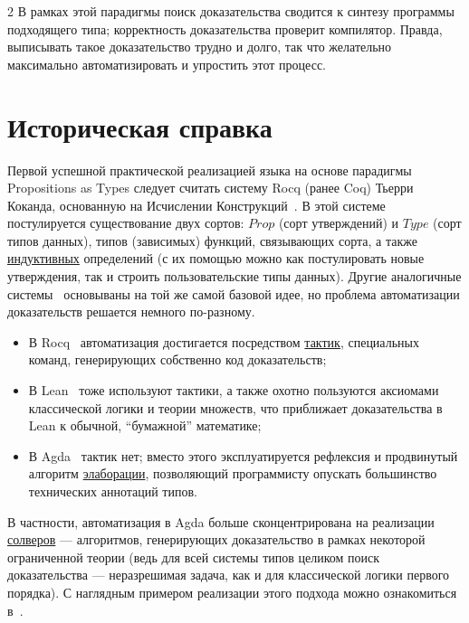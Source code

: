 \documentclass[final]{beamer}
\begin{document}
\begin{frame}[t]
\begin{multicols}{2}
В рамках этой парадигмы поиск доказательства сводится к
синтезу программы подходящего типа; корректность
доказательства проверит компилятор. Правда, выписывать
такое доказательство трудно и долго, так что желательно
максимально автоматизировать и упростить этот процесс.

\section{Историческая справка}

Первой успешной практической реализацией языка на основе
парадигмы Propositions as Types следует считать систему
Rocq (ранее Coq) Тьерри Коканда, основанную на
Исчислении Конструкций~\cite{COQUAND198895}. В этой
системе постулируется существование двух сортов:
$Prop$ (сорт утверждений) и $Type$ (сорт типов данных),
типов (зависимых) функций, связывающих сорта, а также
\underline{индуктивных} определений (с их помощью можно
как постулировать новые утверждения, так и строить
пользовательские типы данных). Другие аналогичные
системы~\cite{norell:thesis, moura2021lean} основываны
на той же самой базовой идее, но проблема автоматизации
доказательств решается немного по-разному.

\begin{itemize}
    \item В Rocq~\cite{the_coq_development_team_2024_14542673}
        автоматизация достигается посредством
        \underline{тактик}, специальных команд,
        генерирующих собственно код доказательств;
    \item В Lean~\cite{moura2021lean} тоже используют
        тактики, а также охотно пользуются аксиомами
        классической логики и теории множеств, что
        приближает доказательства в Lean к обычной,
        ``бумажной'' математике;
    \item В Agda~\cite{norell:thesis} тактик нет;
        вместо этого эксплуатируется рефлексия и
        продвинутый алгоритм \underline{элаборации},
        позволяющий программисту опускать большинство
        технических аннотаций типов.
\end{itemize}

В частности, автоматизация в Agda больше
сконцентрирована на реализации \underline{солверов} ---
алгоритмов, генерирующих доказательство в рамках
некоторой ограниченной теории (ведь для всей системы
типов целиком поиск доказательства --- неразрешимая
задача, как и для классической логики первого порядка).
С наглядным примером реализации этого подхода можно
ознакомиться в~\cite{agdareflection}.


\end{multicols}
\end{frame}
\end{document}
